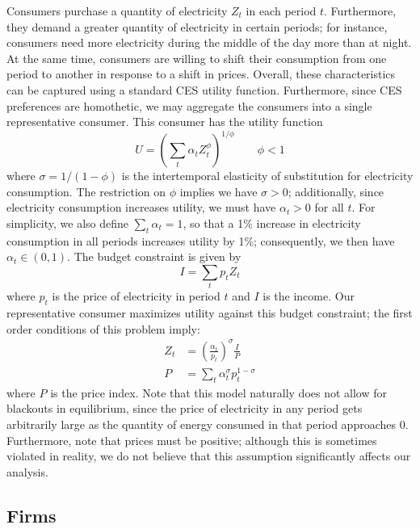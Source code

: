 \documentclass[11pt,a4paper,leqno]{extarticle}
\begin{document}
	Consumers purchase a quantity of electricity $Z_t$ in each period $t$. Furthermore, they demand a greater quantity of electricity in certain periods; for instance, consumers need more electricity during the middle of the day more than at night. At the same time, consumers are willing to shift their consumption from one period to another in response to a shift in prices. Overall, these characteristics can be captured using a standard CES utility function.  Furthermore, since CES preferences are homothetic, we may aggregate the consumers into a single representative consumer. This consumer has the utility function
	\begin{equation}
	U = \left( \sum_t \alpha_t Z_t^\phi  \right)^{1/\phi} \qquad \phi < 1
	\end{equation}
	where $\sigma = 1/(1-\phi)$ is the intertemporal elasticity of substitution for electricity consumption. The restriction on $\phi$ implies we have  $\sigma > 0$; additionally, since electricity consumption increases utility, we must have $\alpha_t > 0$ for all $t$.  For simplicity, we also define $\sum_t \alpha_t = 1$, so that a 1\% increase in electricity consumption in all periods increases utility by 1\%; consequently, we then have $\alpha_t \in (0,1)$. The budget constraint is given by
	\begin{equation}
	I = \sum_t p_t Z_t
	\end{equation}
	where $p_t$ is the price of electricity in period $t$ and $I$ is the income. Our representative consumer maximizes utility against this budget constraint; the first order conditions of this problem imply:
	\begin{align}\label{eq:demand}
	Z_t &= \left(\frac{\alpha_t}{p_t} \right)^\sigma \frac{I}{P} \\\label{eq:priceindex}
	P &= \sum_t \alpha_t^\sigma p_t^{1-\sigma}
	\end{align}
	where $P$ is the price index. Note that this model naturally does not allow for blackouts in equilibrium, since the price of electricity in any period gets arbitrarily large as the quantity of energy consumed in that period approaches 0. Furthermore, note that prices must be positive; although this is sometimes violated in reality, we do not believe that this assumption significantly affects our analysis. 
	
	\subsection{Firms}
	
\end{document}
